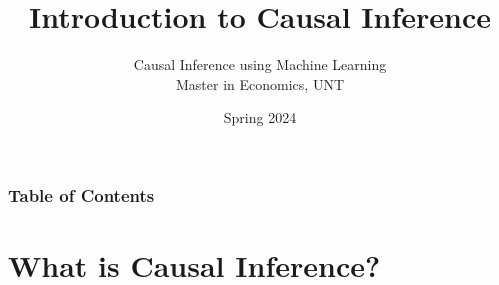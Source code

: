 \documentclass[xcolor=svgnames,t]{beamer}
\title[Introduction to Causal Inference]{Introduction to Causal Inference}
\subtitle{}
\author[CIML ]{Causal Inference using Machine Learning\\ Master in Economics, UNT}
\institute[]{Andres Mena}
\date{Spring 2024}
\begin{document}
\begin{frame}
\maketitle
\end{frame}


\begin{frame}
    \frametitle{Table of Contents}
    \tableofcontents
\end{frame}

\section{What is Causal Inference?}
\end{document}
